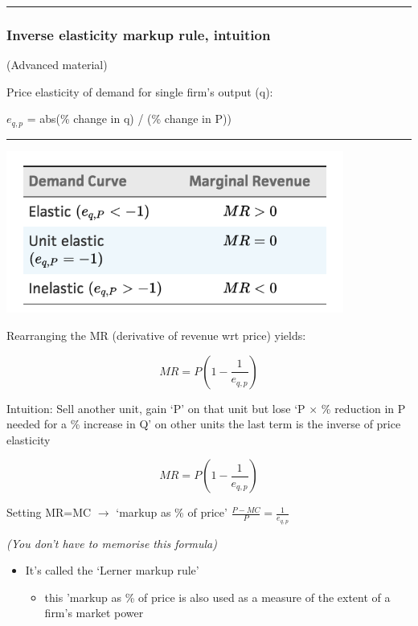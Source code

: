 \documentclass[]{article}
\providecommand{\tightlist}{%
  \setlength{\itemsep}{0pt}\setlength{\parskip}{0pt}}
\begin{document}
\begin{center}\rule{0.5\linewidth}{\linethickness}\end{center}

\hypertarget{inverse-elasticity-markup-rule-intuition}{%
\subsubsection{Inverse elasticity markup rule, intuition}\label{inverse-elasticity-markup-rule-intuition}}

(Advanced material)

Price elasticity of demand for single firm's output (q):

\(e_{q,p}\) = abs(\% change in q) / (\% change in P))

\begin{center}\rule{0.5\linewidth}{\linethickness}\end{center}

\includegraphics[height=2.1in]{picsfigs/elast_vs_mr.png}

\bigskip

Rearranging the MR (derivative of revenue wrt price) yields:

\[MR= P(1-\frac{1}{e_{q,p}})\]

Intuition: Sell another unit, gain `P' on that unit
but lose `P \(\times\) \% reduction in P needed for a \% increase in Q' on other units
the last term is the inverse of price elasticity

\[MR= P(1-\frac{1}{e_{q,p}})\]

Setting MR=MC \(\rightarrow\) `markup as \% of price' \(\frac{P-MC}{P}=\frac{1}{e_{q,p}}\)

\emph{(You don't have to memorise this formula)}

\begin{itemize}
\tightlist
\item
  It's called the `Lerner markup rule'

  \begin{itemize}
  \tightlist
  \item
    this 'markup as \% of price is also used as a measure of the extent of a firm's market power
  \end{itemize}
\end{itemize}
\end{document}
